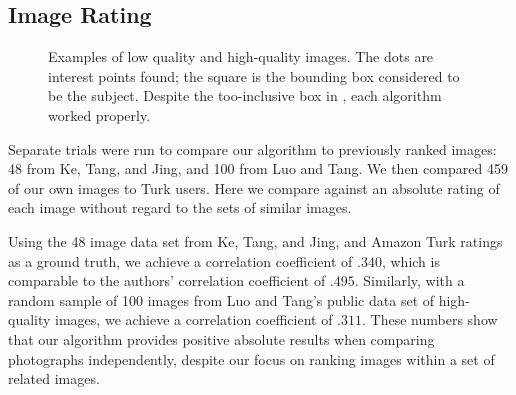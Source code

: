 \documentclass{article}
\begin{document}
\subsection{Image Rating}
\begin{figure*}[t]
\centering
{}
\caption{Examples of  low quality and  high-quality images. The dots are interest points found; the square is the bounding box considered to be the subject. Despite the too-inclusive box in , each algorithm worked properly.}
\label{fig:Examples}
\end{figure*}

Separate trials were run to compare our algorithm to previously ranked images: 48 from Ke, Tang, and Jing\cite{1640788}, and 100 from Luo and Tang\cite{springerlink:10.1007/978-3-540-88690-7_29}. We then compared 459 of our own images to Turk users. Here we compare against an absolute rating of each image without regard to the sets of similar images.

Using the 48 image data set from Ke, Tang, and Jing\cite{1640788}, and Amazon Turk ratings as a ground truth, we achieve a correlation coefficient of \(.340\), which is comparable to the authors' correlation coefficient of \(.495\). Similarly, with a random sample of 100 images from Luo and Tang's public data set of high-quality images\cite{springerlink:10.1007/978-3-540-88690-7_29}, we achieve a correlation coefficient of \(.311\). These numbers show that our algorithm provides positive absolute results when comparing photographs independently, despite our focus on ranking images within a set of related images.

\end{document}
